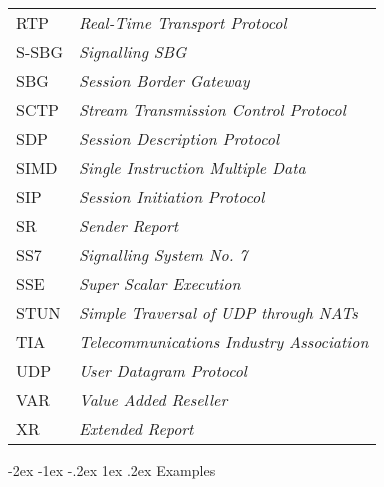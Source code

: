 \documentclass[letterpaper,final,notitlepage,twocolumn,10pt,twoside]{article}
\makeatletter
\let\large = \normalsize
\let\normalsize = \small
\let\small = \footnotesize
\let\footnotesize = \scriptsize
\let\scriptsize = \tiny
\renewcommand\section{\@startsection {section}{1}{\z@}%
                                   {-2ex \@plus -1ex \@minus -.2ex}%
                                   {1ex \@plus .2ex}%
                                   {\normalfont\large\bfseries}}
\makeatother
\begin{document}
\begin{tabular}{ll}
RTP    & {\it Real-Time Transport Protocol}\\
S-SBG  & {\it Signalling SBG}\\
SBG    & {\it Session Border Gateway}\\
SCTP   & {\it Stream Transmission Control Protocol}\\
SDP    & {\it Session Description Protocol}\\
SIMD   & {\it Single Instruction Multiple Data}\\
SIP    & {\it Session Initiation Protocol}\\
SR     & {\it Sender Report}\\
SS7    & {\it Signalling System No. 7}\\
SSE    & {\it Super Scalar Execution}\\
STUN   & {\it Simple Traversal of UDP through NATs}\\
TIA    & {\it Telecommunications Industry Association}\\
UDP    & {\it User Datagram Protocol}\\
VAR    & {\it Value Added Reseller}\\
XR     & {\it Extended Report}\\
\end{tabular}

\FloatBarrier
{}


\begin{appendix}

\section{Examples}

\end{appendix}
\end{document}

